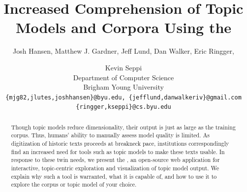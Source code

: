 \documentclass[11pt]{article}
\title{Increased Comprehension of Topic Models and Corpora Using the \tool}
\author{Josh Hansen, Matthew J. Gardner, Jeff Lund, Dan Walker, Eric Ringger, \and Kevin Seppi\\
Department of Computer Science\\
Brigham Young University\\
\tt \{mjg82,jlutes,joshhansen\}@byu.edu, \{jefflund,danwalkeriv\}@gmail.com\\
\tt \{ringger,kseppi\}@cs.byu.edu}
\begin{document}
\maketitle

\begin{abstract}
Though topic models reduce dimensionality, their output is just as large as the
training corpus. Thus, humans' ability to manually assess model quality is
limited. As digitization of historic texts proceeds at breakneck pace,
institutions correspondingly find an increased need for tools such as topic
models to make these texts usable. In response to these twin needs, we present
the \tool, an open-source web application for interactive,
topic-centric exploration and visualization of topic model output. We explain
why such a tool is warranted, what it is capable of, and how to use it to
explore the corpus or topic model of your choice.
\end{abstract}
\end{document}
